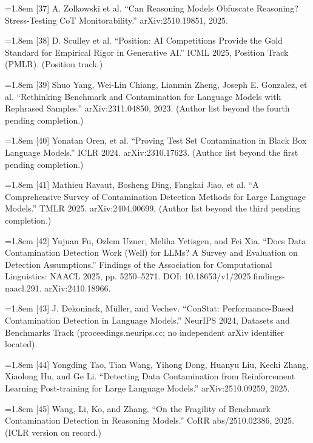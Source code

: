 \documentclass[11pt]{article}
\begin{document}
\noindent\hangindent=1.8em [37] A. Zolkowski et al. ``Can Reasoning Models Obfuscate Reasoning? Stress-Testing CoT Monitorability.'' arXiv:2510.19851, 2025.\par\medskip
\noindent\hangindent=1.8em [38] D. Sculley et al. ``Position: AI Competitions Provide the Gold Standard for Empirical Rigor in Generative AI.'' ICML 2025, Position Track (PMLR). (Position track.)\par\medskip
\noindent\hangindent=1.8em [39] Shuo Yang, Wei-Lin Chiang, Lianmin Zheng, Joseph E. Gonzalez, et al. ``Rethinking Benchmark and Contamination for Language Models with Rephrased Samples.'' arXiv:2311.04850, 2023. (Author list beyond the fourth pending completion.)\par\medskip
\noindent\hangindent=1.8em [40] Yonatan Oren, et al. ``Proving Test Set Contamination in Black Box Language Models.'' ICLR 2024. arXiv:2310.17623. (Author list beyond the first pending completion.)\par\medskip
\noindent\hangindent=1.8em [41] Mathieu Ravaut, Bosheng Ding, Fangkai Jiao, et al. ``A Comprehensive Survey of Contamination Detection Methods for Large Language Models.'' TMLR 2025. arXiv:2404.00699. (Author list beyond the third pending completion.)\par\medskip
\noindent\hangindent=1.8em [42] Yujuan Fu, Ozlem Uzner, Meliha Yetisgen, and Fei Xia. ``Does Data Contamination Detection Work (Well) for LLMs? A Survey and Evaluation on Detection Assumptions.'' Findings of the Association for Computational Linguistics: NAACL 2025, pp. 5250–5271. DOI: 10.18653/v1/2025.findings-naacl.291. arXiv:2410.18966.\par\medskip
\noindent\hangindent=1.8em [43] J. Dekoninck, Müller, and Vechev. ``ConStat: Performance-Based Contamination Detection in Language Models.'' NeurIPS 2024, Datasets and Benchmarks Track (proceedings.neurips.cc; no independent arXiv identifier located).\par\medskip
\noindent\hangindent=1.8em [44] Yongding Tao, Tian Wang, Yihong Dong, Huanyu Liu, Kechi Zhang, Xiaolong Hu, and Ge Li. ``Detecting Data Contamination from Reinforcement Learning Post-training for Large Language Models.'' arXiv:2510.09259, 2025.\par\medskip
\noindent\hangindent=1.8em [45] Wang, Li, Ko, and Zhang. ``On the Fragility of Benchmark Contamination Detection in Reasoning Models.'' CoRR abs/2510.02386, 2025. (ICLR version on record.)\par\medskip
\end{document}
